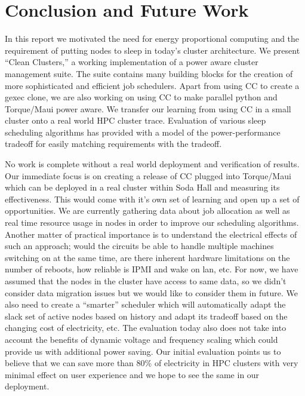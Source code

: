 \section{Conclusion and Future Work} %
\label{sec:conclusion_and_future_work}
In this report we motivated the need for energy proportional computing and the requirement of putting nodes to sleep in today's cluster architecture. We present ``Clean Clusters,'' a working implementation of a power aware cluster management suite. The suite contains many building blocks for the creation of more sophisticated and efficient job schedulers. Apart from using CC to create a gexec clone, we are also working on using CC to make parallel python and Torque/Maui power aware. We transfer our learning from using CC in a small cluster onto a real world HPC cluster trace. Evaluation of various sleep scheduling algorithms has provided with a model of the power-performance tradeoff for easily matching requirements with the tradeoff. 

No work is complete without a real world deployment and verification of results. Our immediate focus is on creating a release of CC plugged into Torque/Maui which can be deployed in a real cluster within Soda Hall and measuring its effectiveness. This would come with it's own set of learning and open up a set of opportunities. We are currently gathering data about job allocation as well as real time resource usage in nodes in order to improve our scheduling algorithms. Another matter of practical importance is to understand the electrical effects of such an approach; would the circuits be able to handle multiple machines switching on at the same time, are there inherent hardware limitations on the number of reboots, how reliable is IPMI and wake on lan, etc. For now, we have assumed that the nodes in the cluster have access to same data, so we didn't consider data migration issues but we would like to consider them in future. We also need to create a ``smarter'' scheduler which will automatically adapt the slack set of active nodes based on history and adapt its tradeoff based on the changing cost of electricity, etc. The evaluation today also does not take into account the benefits of dynamic voltage and frequency scaling which could provide us with additional power saving. Our initial evaluation points us to believe that we can save more than 80\% of electricity in HPC clusters with very minimal effect on user experience and we hope to see the same in our deployment.
